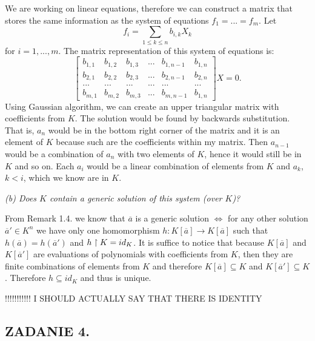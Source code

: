 \documentclass{article}
\begin{document}

We are working on linear equations, therefore we can construct a matrix that stores the same information as the system of equations $f_1=...=f_m$. Let
$$f_i=\sum\limits_{1\leq k\leq n}b_{i, k}X_k$$
for $i=1,...,m$. The matrix representation of this system of equations is:
$$\begin{bmatrix}
    b_{1,1} & b_{1, 2} & b_{1, 3} &... &b_{1, n-1} & b_{1, n}\\
    b_{2,1} & b_{2, 2} & b_{2, 3} &... &b_{2, n-1} & b_{2, n}\\
    ...     &   ...    & ...      &... & ...       & ...\\
    b_{m,1} & b_{m, 2} & b_{m, 3} &... &b_{m, n-1} & b_{1, n}
\end{bmatrix}X=0.$$
Using Gaussian algorithm, we can create an upper triangular matrix with coefficients from $K$. The solution would be found by backwards substitution. That is, $a_n$ would be in the bottom right corner of the matrix and it is an element of $K$ because such are the coefficients within my matrix. Then $a_{n-1}$ would be a combination of $a_n$ with two elements of $K$, hence it would still be in $K$ and so on. Each $a_i$ would be a linear combination of elements from $K$ and $a_k$, $k<i$, which we know are in $K$.

\proofend

\emph{\color{pink}(b) Does $K$ contain a generic solution of this system (over $K$)?}
\smallskip

From Remark 1.4. we know that $\overline{a}$ is a generic solution $\iff$ for any other solution $\overline a'\in K^n$ we have only one homomorphism $h:K[\overline a]\to K[\overline a]$ such that $h(\overline{a})=h(\overline{a}')$ and $h\upharpoonright K=id_K$. It is suffice to notice that because $K[\overline a]$ and $K[\overline a']$ are evaluations of polynomials with coefficients from $K$, then they are finite combinations of elements from $K$ and therefore $K[\overline{a}]\subseteq K$ and $K[\overline a']\subseteq K$. Therefore $h\subseteq id_K$ and thus is unique.

{\color{red}!!!!!!!!!!! I SHOULD ACTUALLY SAY THAT THERE IS IDENTITY}

\subsection*{ZADANIE 4.}
\emph{\color{pink}}
\end{document}

